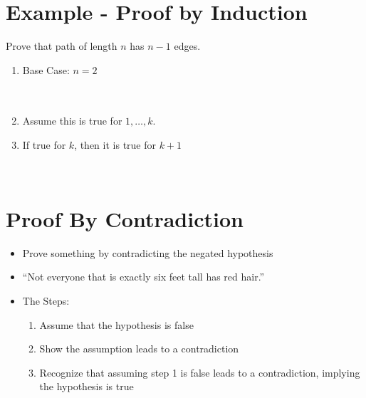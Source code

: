 \documentclass[12pt]{article}
\begin{document}
\section*{Example - Proof by Induction}

Prove that path of length $n$ has $n-1$ edges.

\begin{enumerate}

    \item Base Case: $n=2$ \\ \\
    \begin{tabular}{l}
        
    \end{tabular}

    \item Assume this is true for $1, \ldots, k$.

    \item If true for $k$, then it is true for $k+1$ \\ \\ 
    \begin{tabular}{l l}
        
    \end{tabular}

\end{enumerate}

\pagebreak

\section*{Proof By Contradiction}

\begin{itemize}

    \item Prove something by contradicting the negated hypothesis
    
    \item ``Not everyone that is exactly six feet tall has red hair.''

    \item The Steps:
    \begin{enumerate}

        \item Assume that the hypothesis is false

        \item Show the assumption leads to a contradiction

        \item Recognize that assuming step 1 is false leads to a contradiction, implying the hypothesis is true

    \end{enumerate}


\end{itemize}
\end{document}
